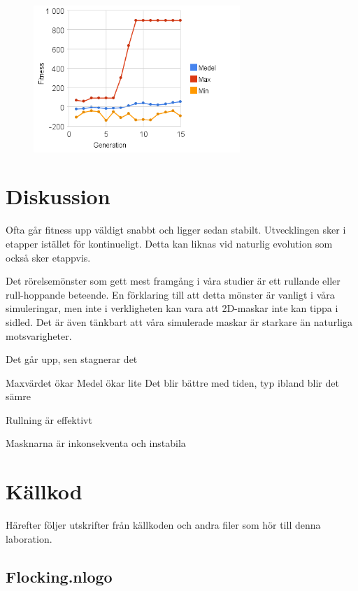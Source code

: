 \documentclass[titlepage, twocolumn, a4paper, 12pt]{article}
\begin{document}
\begin{figure}
    \includegraphics[width=78mm]{images/diagram_m01c08_2.png}
\end{figure}


\section{Diskussion}

Ofta går fitness upp väldigt snabbt och ligger sedan stabilt. Utvecklingen sker i etapper istället för kontinueligt. Detta kan liknas vid naturlig evolution som också sker etappvis. 

Det rörelsemönster som gett mest framgång i våra studier är ett rullande eller rull-hoppande beteende. En förklaring till att detta mönster är vanligt i våra simuleringar, men inte i verkligheten kan vara att 2D-maskar inte kan tippa i sidled. Det är även tänkbart att våra simulerade maskar är starkare än naturliga motsvarigheter. 



Det går upp, sen stagnerar det

Maxvärdet ökar
Medel ökar lite
Det blir bättre med tiden, typ
ibland blir det sämre

Rullning är effektivt

Masknarna är inkonsekventa och instabila








\newpage
\appendix
{}
\section{Källkod}\label{sec:kallkod}
Härefter följer utskrifter från källkoden och andra filer som hör till
denna laboration.

\subsection{Flocking.nlogo}\label{app:Flocking.nlogo}
\begin{footnotesize}
  
\end{footnotesize}
\end{document}

